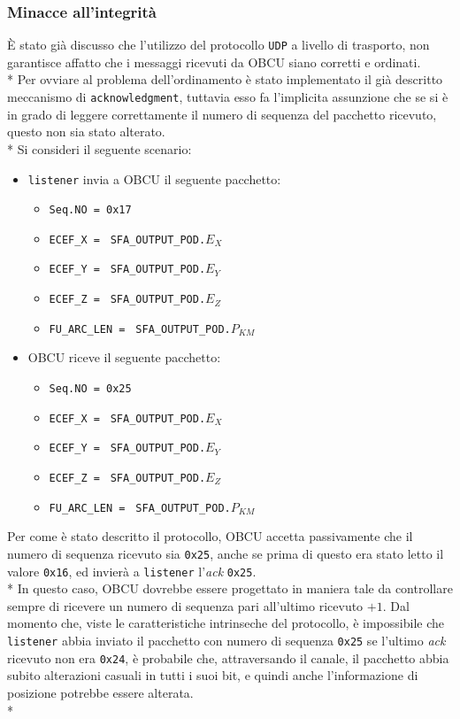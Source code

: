 \subsubsection{Minacce all'integrit\`a}
\`E stato gi\`a discusso che l'utilizzo del protocollo \texttt{UDP} a livello di trasporto, non garantisce affatto che i messaggi ricevuti da OBCU siano corretti e ordinati.\\*
Per ovviare al problema dell'ordinamento \`e stato implementato il gi\`a descritto meccanismo di \texttt{acknowledgment}, tuttavia esso fa l'implicita assunzione che se si \`e in grado di leggere correttamente il numero di sequenza del pacchetto ricevuto, questo non sia stato alterato.\\*
Si consideri il seguente scenario:
\begin{itemize}
	\item \texttt{listener} invia a OBCU il seguente pacchetto:
	\begin{itemize}
		\item \texttt{Seq.NO = 0x17}
		\item \texttt{ECEF\_X = } \texttt{SFA\_OUTPUT\_POD.}$E_X$
		\item \texttt{ECEF\_Y = } \texttt{SFA\_OUTPUT\_POD.}$E_Y$
		\item \texttt{ECEF\_Z = } \texttt{SFA\_OUTPUT\_POD.}$E_Z$
		\item \texttt{FU\_ARC\_LEN = } \texttt{SFA\_OUTPUT\_POD.}$P_{KM}$
	\end{itemize}
	\item OBCU riceve il seguente pacchetto:
\begin{itemize}
	\item \texttt{Seq.NO = 0x25}
	\item \texttt{ECEF\_X = } \texttt{SFA\_OUTPUT\_POD.}$E_X$
	\item \texttt{ECEF\_Y = } \texttt{SFA\_OUTPUT\_POD.}$E_Y$
	\item \texttt{ECEF\_Z = } \texttt{SFA\_OUTPUT\_POD.}$E_Z$
	\item \texttt{FU\_ARC\_LEN = } \texttt{SFA\_OUTPUT\_POD.}$P_{KM}$
\end{itemize}
\end{itemize}
Per come \`e stato descritto il protocollo, OBCU accetta passivamente che il numero di sequenza ricevuto sia \texttt{0x25}, anche se prima di questo era stato letto il valore \texttt{0x16}, ed invier\`a a \texttt{listener} l'\emph{ack} \texttt{0x25}.\\*
In questo caso, OBCU dovrebbe essere progettato in maniera tale da controllare sempre di ricevere un numero di sequenza pari all'ultimo ricevuto $+1$. Dal momento che, viste le caratteristiche intrinseche del protocollo, \`e impossibile che \texttt{listener} abbia inviato il pacchetto con numero di sequenza \texttt{0x25} se l'ultimo \emph{ack} ricevuto non era \texttt{0x24}, \`e probabile che, attraversando il canale, il pacchetto abbia subito alterazioni casuali in tutti i suoi bit, e quindi anche l'informazione di posizione potrebbe essere alterata.\\*
